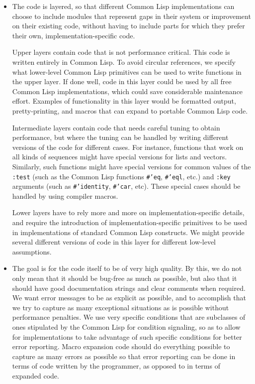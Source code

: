 \begin{itemize}
\item The code is layered, so that different Common Lisp
  implementations can choose to include \sysname{} modules that
  represent gaps in their system or improvement on their existing
  code, without having to include parts for which they prefer their
  own, implementation-specific code. 

  Upper layers contain code that is not performance critical.  This
  code is written entirely in Common Lisp.  To avoid circular
  references, we specify what lower-level Common Lisp primitives can
  be used to write functions in the upper layer.  If done well, code
  in this layer could be used by all free Common Lisp implementations,
  which could save considerable maintenance effort.  Examples of
  functionality in this layer would be formatted output,
  pretty-printing, and macros that can expand to portable Common Lisp
  code.

  Intermediate layers contain code that needs careful tuning to
  obtain performance, but where the tuning can be handled by writing
  different versions of the code for different cases.  For instance,
  functions that work on all kinds of sequences might have special
  versions for lists and vectors.  Similarly, such functions might
  have special versions for common values of the \texttt{:test} (such
  as the Common Lisp functions \texttt{\#'eq}, \texttt{\#'eql}, etc.)
  and \texttt{:key} arguments (such as \texttt{\#'identity},
  \texttt{\#'car}, etc).  These special cases should be handled by
  using compiler macros.

  Lower layers have to rely more and more on implementation-specific
  details, and require the introduction of implementation-specific
  primitives to be used in implementations of standard Common Lisp
  constructs.  We might provide several different versions of code in
  this layer for different low-level assumptions.

\item The goal is for the code itself to be of very high quality.
  By this, we do not only mean that it should be bug-free as much as
  possible, but also that it should have good documentation strings
  and clear comments when required.  We want error messages to be as
  explicit as possible, and to accomplish that we try to capture as
  many exceptional situations as is possible without performance
  penalties.  We use very specific conditions that are subclasses of
  ones stipulated by the Common Lisp \hs{} for condition
  signaling, so as to allow for implementations to take advantage of
  such specific conditions for better error reporting.  Macro
  expansion code should do everything possible to capture as many
  errors as possible so that error reporting can be done in terms of
  code written by the programmer, as opposed to in terms of expanded
  code.

\end{itemize}

